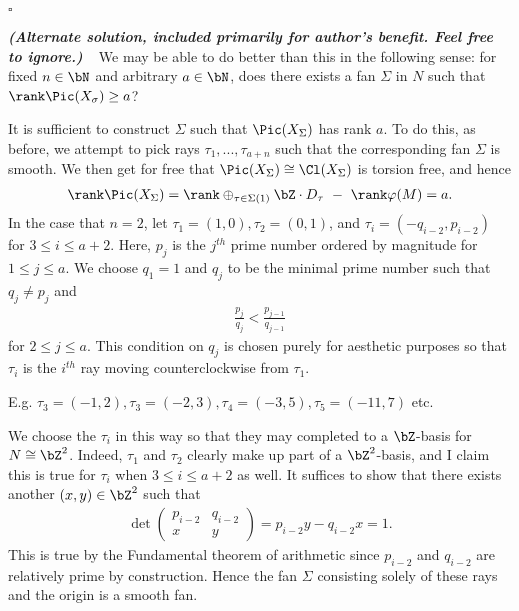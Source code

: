 \begin{homework}[e]
\begin{prf}
		\begin{comment}	
			\red{It might be the case that ``$\Cl(X_\Sigma)$ is torsion free'' implies ``$X_\Sigma$ is smooth'', in which case it is redundant to discuss the smoothness of the fan, but I'm not sure that this is true for non-affine schemes.}
		\end{comment}

		\hfill $\square$

		\bigskip
        
		
		\noindent\textbf{\emph{(Alternate solution, included primarily for author's benefit. Feel free to ignore.)}} ~ We may be able to do better than this in the following sense: for fixed $n \in \bN$ and arbitrary $a \in \bN$, does there exists a fan $\Sigma$ in $N$ such that $\rank \Pic(X_\sigma) \geq a$?

		It is sufficient to construct $\Sigma$ such that $\Pic(X_\Sigma)$ has rank $a$. To do this, as before, we attempt to pick rays $\tau_1,...,\tau_{a+n}$ such that the corresponding fan $\Sigma$ is smooth. We then get for free that $\Pic(X_\Sigma) \cong \Cl(X_\Sigma)$ is torsion free, and hence
		\begin{align*}
			\rank \Pic(X_\Sigma) = \rank \oplus_{\tau \in \Sigma(1)} \bZ\cdot D_\tau ~ - ~ \rank \varphi(M) = a.
		\end{align*}
		In the case that $n = 2$, let $\tau_1 = (1,0), \tau_2 = (0,1)$, and $\tau_i = (-q_{i-2},p_{i-2})$ for $3 \leq i \leq a + 2$. Here, $p_j$ is the $j^{th}$ prime number ordered by magnitude for $1\leq j \leq a$. We choose $q_1 = 1$ and $q_j$ to be the minimal prime number such that $q_j \neq p_j$ and
		\begin{align*}
			\frac{p_{j}}{q_{j}} < \frac{p_{j-1}}{q_{j-1}}
		\end{align*}
		for $2 \leq j \leq a$. This condition on $q_j$ is chosen purely for aesthetic purposes so that $\tau_i$ is the $i^{th}$ ray moving counterclockwise from $\tau_1$.

		E.g. $\tau_3 = (-1,2), \tau_3 = (-2, 3), \tau_4 = (-3,5), \tau_5 = (-11,7)$ etc.

		We choose the $\tau_i$ in this way so that they may completed to a $\bZ$-basis for $N \cong \bZ^2$. Indeed, $\tau_1$ and $\tau_2$ clearly make up part of a $\bZ^2$-basis, and I claim this is true for $\tau_i$ when $3 \leq i\leq a+2$ as well. It suffices to show that there exists another $(x,y) \in \bZ^2$ such that
		\begin{align*}
			\det
			\begin{pmatrix}	
				p_{i-2} & q_{i-2} \\
				x & y
			\end{pmatrix} = p_{i-2}y - q_{i-2}x = 1.
		\end{align*}
		This is true by the Fundamental theorem of arithmetic since $p_{i-2}$ and $q_{i-2}$ are relatively prime by construction. Hence the fan $\Sigma$ consisting solely of these rays and the origin is a smooth fan.


\end{prf}
\end{homework}

